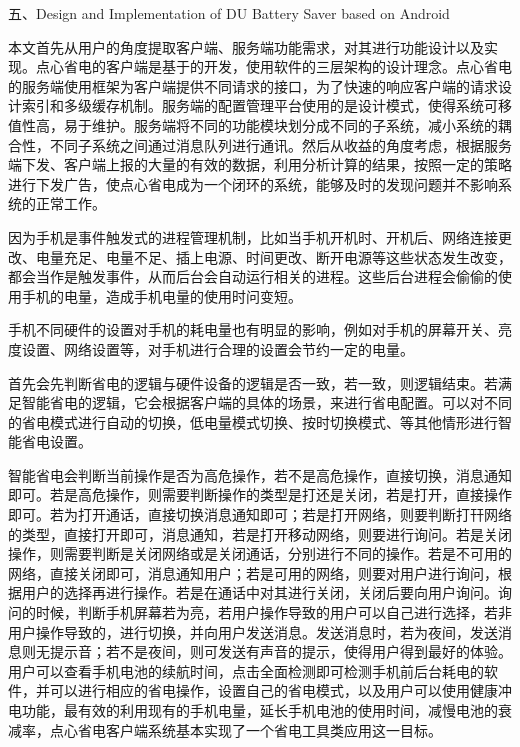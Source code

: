 \documentclass[a4paper]{article}
\begin{document}
五、Design and Implementation of DU Battery Saver based on Android


本文首先从用户的角度提取客户端、服务端功能需求，对其进行功能设计以及实现。点心省电的客户端是基于的开发，使用软件的三层架构的设计理念。点心省电的服务端使用框架为客户端提供不同请求的接口，为了快速的响应客户端的请求设计索引和多级缓存机制。服务端的配置管理平台使用的是设计模式，使得系统可移值性高，易于维护。服务端将不同的功能模块划分成不同的子系统，减小系统的耦合性，不同子系统之间通过消息队列进行通讯。然后从收益的角度考虑，根据服务端下发、客户端上报的大量的有效的数据，利用分析计算的结果，按照一定的策略进行下发广告，使点心省电成为一个闭环的系统，能够及时的发现问题并不影响系统的正常工作。

因为手机是事件触发式的进程管理机制，比如当手机开机时、开机后、网络连接更改、电量充足、电量不足、插上电源、时间更改、断开电源等这些状态发生改变，都会当作是触发事件，从而后台会自动运行相关的进程。这些后台进程会偷偷的使用手机的电量，造成手机电量的使用时问变短。

手机不同硬件的设置对手机的耗电量也有明显的影响，例如对手机的屏幕开关、亮度设置、网络设置等，对手机进行合理的设置会节约一定的电量。

首先会先判断省电的逻辑与硬件设备的逻辑是否一致，若一致，则逻辑结束。若满足智能省电的逻辑，它会根据客户端的具体的场景，来进行省电配置。可以对不同的省电模式进行自动的切换，低电量模式切换、按时切换模式、等其他情形进行智能省电设置。

智能省电会判断当前操作是否为高危操作，若不是高危操作，直接切换，消息通知即可。若是高危操作，则需要判断操作的类型是打还是关闭，若是打开，直接操作即可。若为打开通话，直接切换消息通知即可；若是打开网络，则要判断打幵网络的类型，直接打开即可，消息通知，若是打开移动网络，则要进行询问。若是关闭操作，则需要判断是关闭网络或是关闭通话，分别进行不同的操作。若是不可用的网络，直接关闭即可，消息通知用户；若是可用的网络，则要对用户进行询问，根据用户的选择再进行操作。若是在通话中对其进行关闭，关闭后要向用户询问。询问的时候，判断手机屏幕若为亮，若用户操作导致的用户可以自己进行选择，若非用户操作导致的，进行切换，并向用户发送消息。发送消息时，若为夜间，发送消息则无提示音；若不是夜间，则可发送有声音的提示，使得用户得到最好的体验。用户可以查看手机电池的续航时间，点击全面检测即可检测手机前后台耗电的软件，并可以进行相应的省电操作，设置自己的省电模式，以及用户可以使用健康冲电功能，最有效的利用现有的手机电量，延长手机电池的使用时间，减慢电池的衰减率，点心省电客户端系统基本实现了一个省电工具类应用这一目标。
\end{document}
